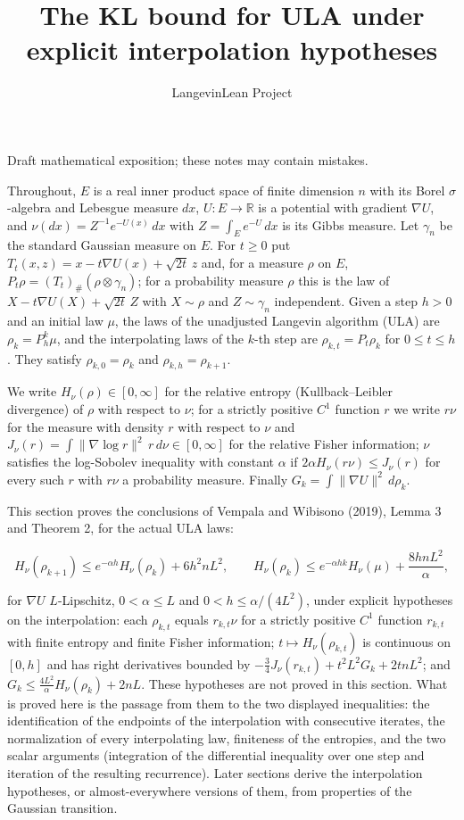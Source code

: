 \documentclass[11pt,a4paper]{article}
\title{\texorpdfstring{The KL bound for ULA under explicit interpolation hypotheses}{The KL bound for ULA under explicit interpolation hypotheses}}
\author{LangevinLean Project}
\date{}
\begin{document}
\maketitle
Draft mathematical exposition; these notes may contain mistakes.


Throughout, \(E\) is a real inner product space of finite dimension \(n\) with its Borel \(\sigma\)-algebra and Lebesgue measure \(dx\), \(U:E\to\mathbb R\) is a potential with gradient \(\nabla U\), and \(\nu(dx)=Z^{-1}e^{-U(x)}\,dx\) with \(Z=\int_Ee^{-U}\,dx\) is its Gibbs measure. Let \(\gamma_n\) be the standard Gaussian measure on \(E\). For \(t\ge0\) put \(T_t(x,z)=x-t\nabla U(x)+\sqrt{2t}\,z\) and, for a measure \(\rho\) on \(E\), \(P_t\rho=(T_t)_\#(\rho\otimes\gamma_n)\); for a probability measure \(\rho\) this is the law of \(X-t\nabla U(X)+\sqrt{2t}\,Z\) with \(X\sim\rho\) and \(Z\sim\gamma_n\) independent. Given a step \(h>0\) and an initial law \(\mu\), the laws of the unadjusted Langevin algorithm (ULA) are \(\rho_k=P_h^k\mu\), and the interpolating laws of the \(k\)-th step are \(\rho_{k,t}=P_t\rho_k\) for \(0\le t\le h\). They satisfy \(\rho_{k,0}=\rho_k\) and \(\rho_{k,h}=\rho_{k+1}\).




We write \(H_\nu(\rho)\in[0,\infty]\) for the relative entropy (Kullback–Leibler divergence) of \(\rho\) with respect to \(\nu\); for a strictly positive \(C^1\) function \(r\) we write \(r\nu\) for the measure with density \(r\) with respect to \(\nu\) and \(J_\nu(r)=\int\|\nabla\log r\|^2\,r\,d\nu\in[0,\infty]\) for the relative Fisher information; \(\nu\) satisfies the log-Sobolev inequality with constant \(\alpha\) if \(2\alpha H_\nu(r\nu)\le J_\nu(r)\) for every such \(r\) with \(r\nu\) a probability measure. Finally \(G_k=\int\|\nabla U\|^2\,d\rho_k\).




This section proves the conclusions of Vempala and Wibisono (2019), Lemma 3 and Theorem 2, for the actual ULA laws:


\[H_\nu(\rho_{k+1})\le e^{-\alpha h}H_\nu(\rho_k)+6h^2nL^2,\qquad H_\nu(\rho_k)\le e^{-\alpha hk}H_\nu(\mu)+\frac{8hnL^2}{\alpha},\]


for \(\nabla U\) \(L\)-Lipschitz, \(0<\alpha\le L\) and \(0<h\le\alpha/(4L^2)\), under explicit hypotheses on the interpolation: each \(\rho_{k,t}\) equals \(r_{k,t}\nu\) for a strictly positive \(C^1\) function \(r_{k,t}\) with finite entropy and finite Fisher information; \(t\mapsto H_\nu(\rho_{k,t})\) is continuous on \([0,h]\) and has right derivatives bounded by \(-\frac34J_\nu(r_{k,t})+t^2L^2G_k+2tnL^2\); and \(G_k\le\frac{4L^2}{\alpha}H_\nu(\rho_k)+2nL\). These hypotheses are not proved in this section. What is proved here is the passage from them to the two displayed inequalities: the identification of the endpoints of the interpolation with consecutive iterates, the normalization of every interpolating law, finiteness of the entropies, and the two scalar arguments (integration of the differential inequality over one step and iteration of the resulting recurrence). Later sections derive the interpolation hypotheses, or almost-everywhere versions of them, from properties of the Gaussian transition.
\end{document}
